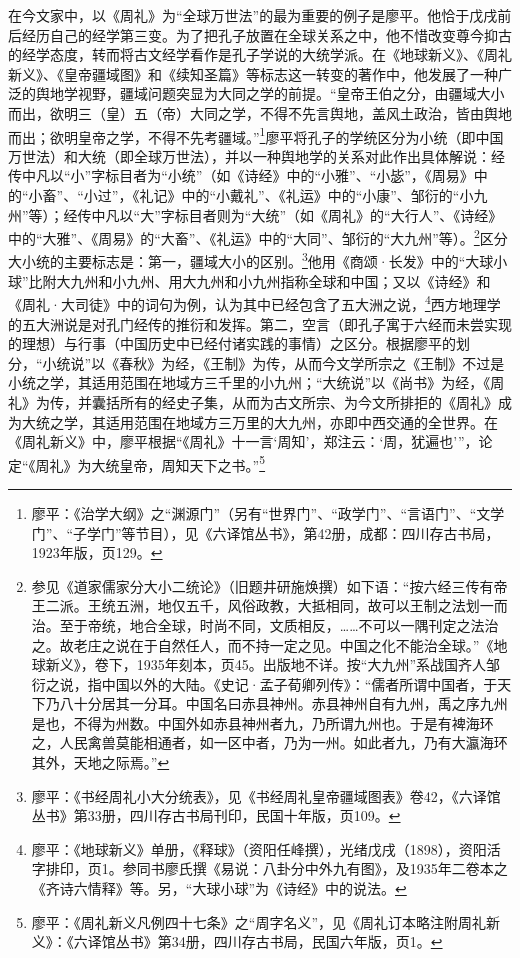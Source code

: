 \documentclass[a4paper, 12pt, openright]{ctexbook}
\begin{document}
在今文家中，以《周礼》为“全球万世法”的最为重要的例子是廖平。他恰于戊戌前后经历自己的经学第三变。为了把孔子放置在全球关系之中，他不惜改变尊今抑古的经学态度，转而将古文经学看作是孔子学说的大统学派。在《地球新义》、《周礼新义》、《皇帝疆域图》和《续知圣篇》等标志这一转变的著作中，他发展了一种广泛的舆地学视野，疆域问题突显为大同之学的前提。“皇帝王伯之分，由疆域大小而出，欲明三（皇）五（帝）大同之学，不得不先言舆地，盖风土政治，皆由舆地而出；欲明皇帝之学，不得不先考疆域。”\footnote{廖平：《治学大纲》之“渊源门”（另有“世界门”、“政学门”、“言语门”、“文学门”、“子学门”等节目），见《六译馆丛书》，第42册，成都：四川存古书局，1923年版，页129。}廖平将孔子的学统区分为小统（即中国万世法）和大统（即全球万世法），并以一种舆地学的关系对此作出具体解说：经传中凡以“小”字标目者为“小统”（如《诗经》中的“小雅”、“小毖”，《周易》中的“小畜”、“小过”，《礼记》中的“小戴礼”、《礼运》中的“小康”、邹衍的“小九州”等）；经传中凡以“大”字标目者则为“大统”（如《周礼》的“大行人”、《诗经》中的“大雅”、《周易》的“大畜”、《礼运》中的“大同”、邹衍的“大九州”等）。\footnote{参见《道家儒家分大小二统论》（旧题井研施焕撰）如下语：“按六经三传有帝王二派。王统五洲，地仅五千，风俗政教，大抵相同，故可以王制之法划一而治。至于帝统，地合全球，时尚不同，文质相反，……不可以一隅刊定之法治之。故老庄之说在于自然任人，而不持一定之见。中国之化不能治全球。”《地球新义》，卷下，1935年刻本，页45。出版地不详。按“大九州”系战国齐人邹衍之说，指中国以外的大陆。《史记·孟子荀卿列传》：“儒者所谓中国者，于天下乃八十分居其一分耳。中国名曰赤县神州。赤县神州自有九州，禹之序九州是也，不得为州数。中国外如赤县神州者九，乃所谓九州也。于是有裨海环之，人民禽兽莫能相通者，如一区中者，乃为一州。如此者九，乃有大瀛海环其外，天地之际焉。”}区分大小统的主要标志是：第一，疆域大小的区别。\footnote{廖平：《书经周礼小大分统表》，见《书经周礼皇帝疆域图表》卷42，《六译馆丛书》第33册，四川存古书局刊印，民国十年版，页109。}他用《商颂·长发》中的“大球小球”比附大九州和小九州、用大九州和小九州指称全球和中国；又以《诗经》和《周礼·大司徒》中的词句为例，认为其中已经包含了五大洲之说，\footnote{廖平：《地球新义》单册，《释球》（资阳任峰撰），光绪戊戌（1898），资阳活字排印，页1。参同书廖氏撰《易说：八卦分中外九有图》，及1935年二卷本之《齐诗六情释》等。另，“大球小球”为《诗经》中的说法。}西方地理学的五大洲说是对孔门经传的推衍和发挥。第二，空言（即孔子寓于六经而未尝实现的理想）与行事（中国历史中已经付诸实践的事情）之区分。根据廖平的划分，“小统说”以《春秋》为经，《王制》为传，从而今文学所宗之《王制》不过是小统之学，其适用范围在地域方三千里的小九州；“大统说”以《尚书》为经，《周礼》为传，并囊括所有的经史子集，从而为古文所宗、为今文所排拒的《周礼》成为大统之学，其适用范围在地域方三万里的大九州，亦即中西交通的全世界。在《周礼新义》中，廖平根据“《周礼》十一言‘周知’，郑注云：‘周，犹遍也’”，论定“《周礼》为大统皇帝，周知天下之书。”\footnote{廖平：《周礼新义凡例四十七条》之“周字名义”，见《周礼订本略注附周礼新义》：《六译馆丛书》第34册，四川存古书局，民国六年版，页1。}
\end{document}

